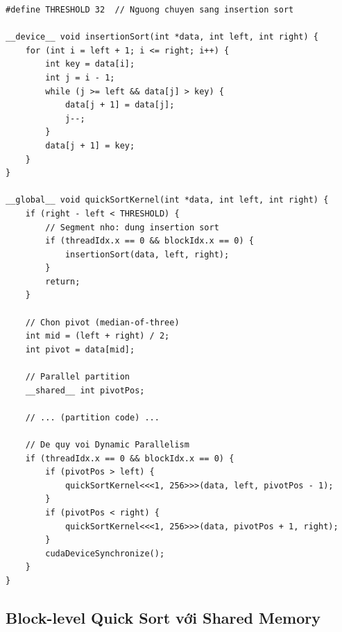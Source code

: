\begin{lstlisting}[caption={Quick Sort với Dynamic Parallelism}, label={lst:quicksort_dynamic}]
#define THRESHOLD 32  // Nguong chuyen sang insertion sort

__device__ void insertionSort(int *data, int left, int right) {
    for (int i = left + 1; i <= right; i++) {
        int key = data[i];
        int j = i - 1;
        while (j >= left && data[j] > key) {
            data[j + 1] = data[j];
            j--;
        }
        data[j + 1] = key;
    }
}

__global__ void quickSortKernel(int *data, int left, int right) {
    if (right - left < THRESHOLD) {
        // Segment nho: dung insertion sort
        if (threadIdx.x == 0 && blockIdx.x == 0) {
            insertionSort(data, left, right);
        }
        return;
    }
    
    // Chon pivot (median-of-three)
    int mid = (left + right) / 2;
    int pivot = data[mid];
    
    // Parallel partition
    __shared__ int pivotPos;
    
    // ... (partition code) ...
    
    // De quy voi Dynamic Parallelism
    if (threadIdx.x == 0 && blockIdx.x == 0) {
        if (pivotPos > left) {
            quickSortKernel<<<1, 256>>>(data, left, pivotPos - 1);
        }
        if (pivotPos < right) {
            quickSortKernel<<<1, 256>>>(data, pivotPos + 1, right);
        }
        cudaDeviceSynchronize();
    }
}
\end{lstlisting}

\subsection{Block-level Quick Sort với Shared Memory}

